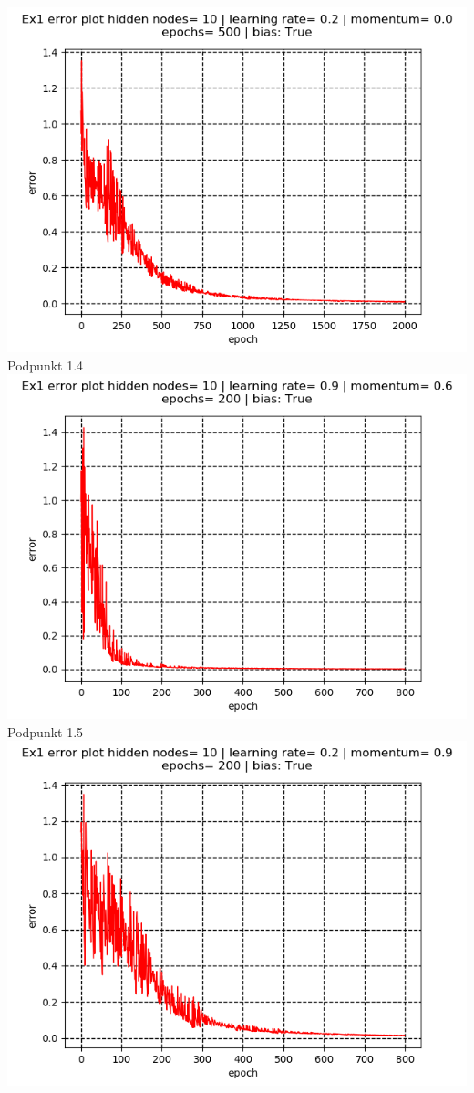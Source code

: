 \documentclass{classrep}
\begin{document}
{\includegraphics{imgs/13.png}\\
Podpunkt 1.4\\
\includegraphics{imgs/14.png}\\
Podpunkt 1.5\\
\includegraphics{imgs/15.png}\\
}  
\end{document}
